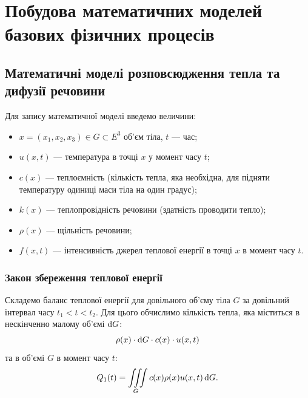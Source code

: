 % 


% 

% 


\setcounter{section}{2}

\section{Побудова математичних моделей базових фізичних процесів}

\subsection{Математичні моделі розповсюдження тепла та дифузії речовини}

Для запису математичної моделі введемо величини:
\begin{itemize}
	\item $x = (x_1, x_2, x_3) \in G \subset E^3$ об'єм тіла, $t$ --- час;
	\item $u(x, t)$ --- температура в точці $x$ у момент часу $t$;
	\item $c(x)$ --- теплоємність (кількість тепла, яка необхідна, для підняти температуру одиниці маси тіла на один градус);
	\item $k(x)$ --- теплопровідність речовини (здатність проводити тепло);
	\item $\rho(x)$ --- щільність речовини;
	\item $f(x, t)$ --- інтенсивність джерел теплової енергії в точці $x$ в момент часу $t$.
\end{itemize}

\subsubsection{Закон збереження теплової енергії}

Складемо баланс теплової енергії для довільного об'єму тіла $G$ за довільний інтервал часу $t_1 < t < t_2$. Для цього обчислимо кількість тепла, яка міститься в нескінченно малому об'ємі $\mathop{}\!\mathrm{d} G$: 
\begin{equation}
	\rho(x) \cdot \mathop{}\!\mathrm{d} G \cdot c(x) \cdot u(x, t)
\end{equation}
та в об'ємі $G$ в момент часу $t$:
\begin{equation}
	Q_1(t) = \displaystyle\iiint\limits_G c(x) \rho(x) u(x, t) \mathop{}\!\mathrm{d} G.
\end{equation}

